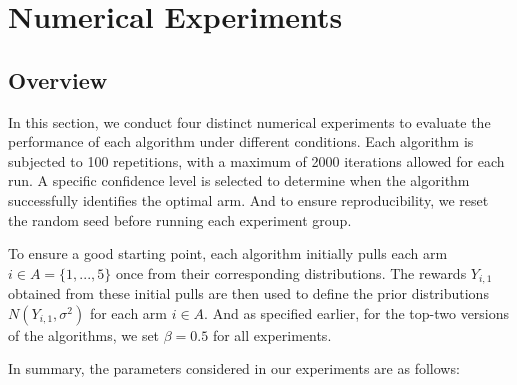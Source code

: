 \documentclass[a4paper, 12pt]{article}
\theoremstyle{definition}
\begin{document}
\section{Numerical Experiments}
\subsection{Overview}
In this section, we conduct four distinct numerical experiments to evaluate the performance of each algorithm under different conditions. Each algorithm is subjected to 100 repetitions, with a maximum of 2000 iterations allowed for each run. A specific confidence level is selected to determine when the algorithm successfully identifies the optimal arm. And to ensure reproducibility, we reset the random seed before running each experiment group.

To ensure a good starting point, each algorithm initially pulls each arm $i \in A = \{1, ..., 5\}$ once from their corresponding distributions. The rewards $Y_{i,1}$ obtained from these initial pulls are then used to define the prior distributions $N(Y_{i,1}, \sigma^2)$ for each arm $i\in A$. And as specified earlier, for the top-two versions of the algorithms, we set $\beta = 0.5$ for all experiments. 

In summary, the parameters considered in our experiments are as follows:
\end{document}
